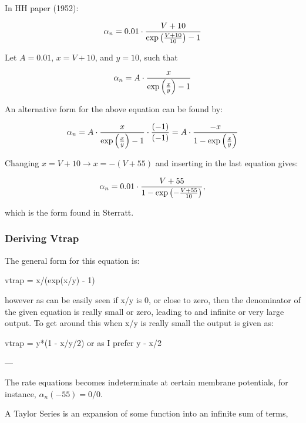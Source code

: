 In HH paper (1952): 

\begin{equation*}
    \alpha_n = 0.01 \cdot \frac{V+10}{\exp \qty(\frac{V+10}{10})-1}
\end{equation*}

Let $A=0.01$, $x=V+10$, and $y=10$, such that

\begin{equation*}
    \alpha_n = A \cdot \frac{x}{\exp \qty(\frac{x}{y})-1}
\end{equation*}

An alternative form for the above equation can be found by: 

\begin{equation*}
    \alpha_n = A \cdot \frac{x}{\exp \qty(\frac{x}{y})-1} \cdot \frac{(-1)}{(-1)} = A \cdot \frac{-x}{1-\exp \qty(\frac{x}{y})} 
\end{equation*}

Changing $x=V+10 \rightarrow x = - (V+55)$ and inserting in the last equation gives:

\begin{equation*}
    \alpha_n = 0.01 \cdot \frac{V+55}{1 - \exp \qty(-\frac{V+55}{10})},
\end{equation*}

which is the form found in Sterratt.

\subsubsection{Deriving Vtrap}

The general form for this equation is:

vtrap = x/(exp(x/y) - 1)

however as can be easily seen if x/y is 0, or close to zero, then the denominator of the given equation is really small or zero, leading to and infinite or very large output. To get around this when x/y is really small the output is given as:

vtrap = y*(1 - x/y/2) or as I prefer y - x/2

---

The rate equations becomes indeterminate at certain membrane potentials, for instance, $\alpha_n (-55) = 0 / 0$. 


A Taylor Series is an expansion of some function into an infinite sum of terms,

